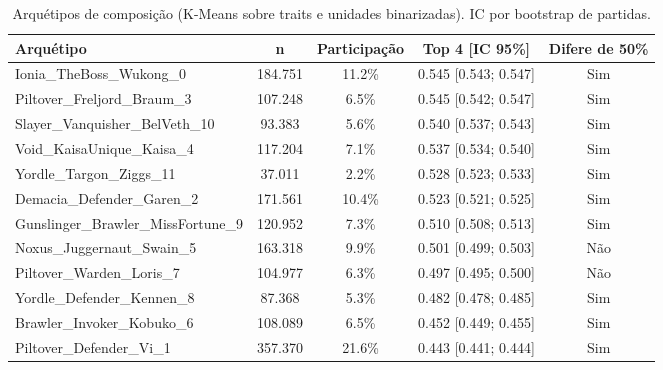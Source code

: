 \begin{table}[htbp]
\caption{Arquétipos de composição (K-Means sobre traits e unidades binarizadas). IC por bootstrap de partidas.}
\label{tab:arquetipos}
\centering
\small
\begin{tabular}{lcccc}
\toprule
Arquétipo & n & Participação & Top 4 [IC 95\%] & Difere de 50\% \\
\midrule
Ionia\_TheBoss\_Wukong\_0 & 184.751 & 11.2\% & 0.545 [0.543; 0.547] & Sim \\
Piltover\_Freljord\_Braum\_3 & 107.248 & 6.5\% & 0.545 [0.542; 0.547] & Sim \\
Slayer\_Vanquisher\_BelVeth\_10 & 93.383 & 5.6\% & 0.540 [0.537; 0.543] & Sim \\
Void\_KaisaUnique\_Kaisa\_4 & 117.204 & 7.1\% & 0.537 [0.534; 0.540] & Sim \\
Yordle\_Targon\_Ziggs\_11 & 37.011 & 2.2\% & 0.528 [0.523; 0.533] & Sim \\
Demacia\_Defender\_Garen\_2 & 171.561 & 10.4\% & 0.523 [0.521; 0.525] & Sim \\
Gunslinger\_Brawler\_MissFortune\_9 & 120.952 & 7.3\% & 0.510 [0.508; 0.513] & Sim \\
Noxus\_Juggernaut\_Swain\_5 & 163.318 & 9.9\% & 0.501 [0.499; 0.503] & Não \\
Piltover\_Warden\_Loris\_7 & 104.977 & 6.3\% & 0.497 [0.495; 0.500] & Não \\
Yordle\_Defender\_Kennen\_8 & 87.368 & 5.3\% & 0.482 [0.478; 0.485] & Sim \\
Brawler\_Invoker\_Kobuko\_6 & 108.089 & 6.5\% & 0.452 [0.449; 0.455] & Sim \\
Piltover\_Defender\_Vi\_1 & 357.370 & 21.6\% & 0.443 [0.441; 0.444] & Sim \\
\bottomrule
\end{tabular}
\end{table}
